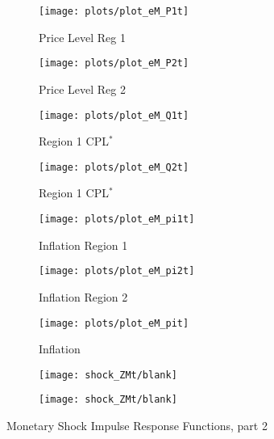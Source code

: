 \documentclass[../thesis.tex]{subfiles}
\begin{document}
\begin{figure}[h!]
	\begin{subfigure}[b]{0.25\textwidth}
		\centering
		\texttt{[image: plots/plot\_eM\_P1t]}
		\caption{\footnotesize Price Level Reg 1}
		\label{fig:ZMt-P1t}
	\end{subfigure}
	\hfill
	\begin{subfigure}[b]{0.25\textwidth}
		\centering
		\texttt{[image: plots/plot\_eM\_P2t]}
		\caption{\footnotesize Price Level Reg 2}
		\label{fig:ZMt-P2t}
	\end{subfigure}
	\hfill
	\begin{subfigure}[b]{0.25\textwidth}
		\centering
		\texttt{[image: plots/plot\_eM\_Q1t]}
		\caption{\footnotesize Region 1 CPL$^{\ast}$}
		\label{fig:ZMt-Q1t}
	\end{subfigure}
	\hfill		
	\vspace*{0.5cm}
	
	
	\begin{subfigure}[b]{0.25\textwidth}
		\centering
		\texttt{[image: plots/plot\_eM\_Q2t]}
		\caption{\footnotesize Region 1 CPL$^{\ast}$}
		\label{fig:ZMt-Q2t}
	\end{subfigure}
	\hfill
	\begin{subfigure}[b]{0.25\textwidth}
		\centering
		\texttt{[image: plots/plot\_eM\_pi1t]}
		\caption{\footnotesize Inflation Region 1}
		\label{fig:ZMt-pi1t}
	\end{subfigure}
	\hfill
	\begin{subfigure}[b]{0.25\textwidth}
		\centering
		\texttt{[image: plots/plot\_eM\_pi2t]}
		\caption{\footnotesize Inflation Region 2}
		\label{fig:ZMt-pi2t}
	\end{subfigure}
	\hfill
	\vspace*{0.5cm}
	
	
	\begin{subfigure}[b]{0.25\textwidth}
		\centering
		\texttt{[image: plots/plot\_eM\_pit]}
		\caption{\footnotesize Inflation}
		\label{fig:ZMt-pit}
	\end{subfigure}
	\hfill
	\begin{subfigure}[b]{0.25\textwidth}
		\centering
		\texttt{[image: shock\_ZMt/blank]}
	\end{subfigure}
	\hfill
	\begin{subfigure}[b]{0.25\textwidth}
		\centering
		\texttt{[image: shock\_ZMt/blank]}
	\end{subfigure}
	\hfill
	\vspace*{0.5cm}		
	\caption{Monetary Shock Impulse Response Functions, part 2}
	\label{fig:ZMt-irf2}
\end{figure}
\end{document}
